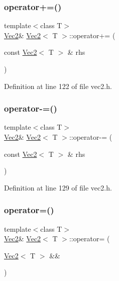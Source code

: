 \subsubsection{\texorpdfstring{operator+=()}{operator+=()}}
{\footnotesize\ttfamily template$<$class T$>$ \\
\mbox{\hyperlink{class_vec2}{Vec2}}\& \mbox{\hyperlink{class_vec2}{Vec2}}$<$ T $>$\+::operator+= (\begin{DoxyParamCaption}\item[{const \mbox{\hyperlink{class_vec2}{Vec2}}$<$ T $>$ \&}]{rhs }\end{DoxyParamCaption})\hspace{0.3cm}{\ttfamily [inline]}}



Definition at line 122 of file vec2.\+h.

\mbox{\label{class_vec2_a91f9eab3c7a93d7e3465228fb5ec489e}} 
\subsubsection{\texorpdfstring{operator-\/=()}{operator-=()}}
{\footnotesize\ttfamily template$<$class T$>$ \\
\mbox{\hyperlink{class_vec2}{Vec2}}\& \mbox{\hyperlink{class_vec2}{Vec2}}$<$ T $>$\+::operator-\/= (\begin{DoxyParamCaption}\item[{const \mbox{\hyperlink{class_vec2}{Vec2}}$<$ T $>$ \&}]{rhs }\end{DoxyParamCaption})\hspace{0.3cm}{\ttfamily [inline]}}



Definition at line 129 of file vec2.\+h.

\mbox{\label{class_vec2_a13ea5fda8289d864dd67d13fcbfc12b7}} 
\subsubsection{\texorpdfstring{operator=()}{operator=()}\hspace{0.1cm}{\footnotesize\ttfamily [1/2]}}
{\footnotesize\ttfamily template$<$class T$>$ \\
\mbox{\hyperlink{class_vec2}{Vec2}}\& \mbox{\hyperlink{class_vec2}{Vec2}}$<$ T $>$\+::operator= (\begin{DoxyParamCaption}\item[{\mbox{\hyperlink{class_vec2}{Vec2}}$<$ T $>$ \&\&}]{ }\end{DoxyParamCaption})\hspace{0.3cm}{\ttfamily [default]}}

